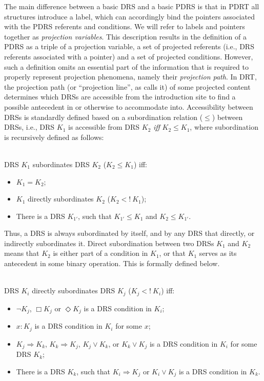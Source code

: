 The main difference between a basic DRS and a basic PDRS is that in PDRT all
structures introduce a label, which can accordingly bind the pointers
associated with the PDRS referents and conditions. We will refer to labels
and pointers together as \textit{projection variables}. This description
results in the definition of a PDRS as a triple of a projection variable,
a set of projected referents (i.e., DRS referents associated with a pointer)
and a set of projected conditions. However, such a definition omits an
essential part of the information that is required to properly represent
projection phenomena, namely their \emph{projection path}. In DRT, the
projection path (or ``projection line'', as
 calls it) of some projected content
determines which DRSs are accessible from the introduction site to find
a possible antecedent in or otherwise to accommodate into. Accessibility
between DRSs is standardly defined based on a subordination relation
($\leq$) between DRSs, i.e., DRS $K_1$ is accessible from DRS $K_2$
\textit{iff} $K_2\leq K_1$, where subordination is recursively defined as
follows:

\begin{definition}\label{def:DRSsub}~\\
DRS $K_1$ subordinates DRS $K_2$ ($K_2 \leq K_1$) iff:
  \begin{itemize}
    \item $K_1 = K_2$;
    \item $K_1$ directly subordinates $K_2$ ($K_2 <!~K_1$);
    \item There is a DRS $K_{1'}$, such that $K_{1'} \leq K_1$ and 
      $K_2 \leq K_{1'}$.
  \end{itemize}
  \end{definition}

\noindent Thus, a DRS is always subordinated by itself, and by any DRS that
directly, or indirectly subordinates it. Direct subordination between two
DRSs $K_1$ and $K_2$ means that $K_2$ is either part of a condition in
$K_1$, or that $K_1$ serves as its antecedent in some binary operation. This
is formally defined below.

\begin{definition}~\\
DRS $K_i$ directly subordinates DRS $K_j$ ($K_j <!~K_i$) iff:
  \begin{itemize}
    \item $\neg K_j$, $\Box K_j$ or $\Diamond K_j$ is a DRS condition in
      $K_i$;
    \item $x:K_j$ is a DRS condition in $K_i$ for some $x$;
    \item $K_j \Rightarrow K_k$, $K_k \Rightarrow K_j$, $K_j \vee K_k$, or 
      $K_k \vee K_j$ is a DRS condition in $K_i$ for some DRS $K_k$;
    \item There is a DRS $K_k$, such that $K_i \Rightarrow K_j$ or $K_i \vee K_j$
      is a DRS condition in $K_k$.
  \end{itemize}
\end{definition}

